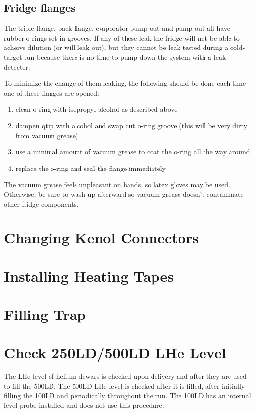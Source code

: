 \subsection{Fridge flanges}
The triple flange, \het{} back flange, evaporator pump out and \het{} pump out all have rubber o-rings set in grooves.  If any of these leak the fridge will not be able to acheive dilution (or \het{} will leak out), but they cannot be leak tested during a cold-target run because there is no time to pump down the system with a leak detector.

To minimize the change of them leaking, the following should be done each time one of these flanges are opened:

\begin{enumerate}
 \item clean o-ring with isopropyl alcohol as described above
 \item dampen qtip with alcohol and swap out o-ring groove (this will be very dirty from vacuum grease)
 \item use a minimal amount of vacuum grease to coat the o-ring all the way around
 \item replace the o-ring and seal the flange immediately
\end{enumerate}

The vacuum grease feels unpleasant on hands, so latex gloves may be used.  Otherwise, be sure to wash up afterward so vacuum grease doesn't contaminate other fridge components.



\section{Changing Kenol Connectors}

\section{Installing Heating Tapes}

\section{Filling \lnn{} Trap}

\section{Check 250LD/500LD LHe Level}
\label{procedure:check-lhe-level}
The LHe level of helium dewars is checked upon delivery and after they are used to fill the 500LD. The 500LD LHe level is checked after it is filled, after initially filling the 100LD and periodically throughout the run. The 100LD has an internal level probe installed and does not use this procedure.

